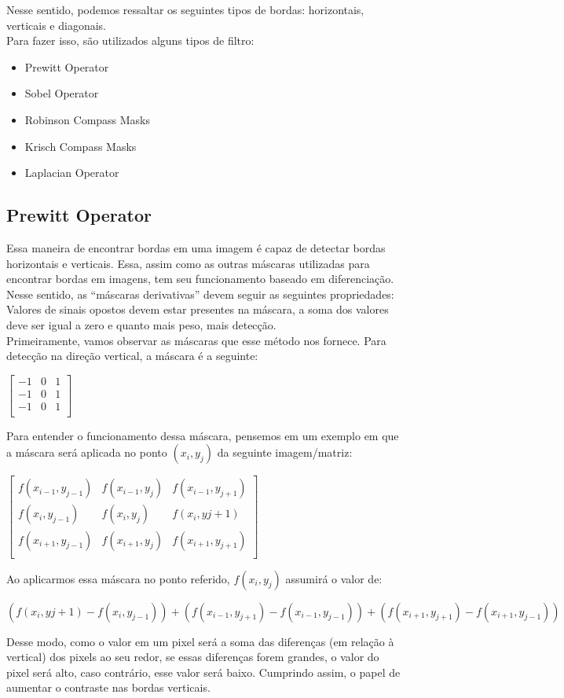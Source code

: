 \documentclass[a4paper, 12pt]{article}
\begin{document}
Nesse sentido, podemos ressaltar os seguintes tipos de bordas: horizontais, verticais e diagonais.
\\

Para fazer isso, são utilizados alguns tipos de filtro:
\begin{itemize}
	\item Prewitt Operator
 	\item Sobel Operator
  	\item Robinson Compass Masks
   	\item Krisch Compass Masks
    \item Laplacian Operator 
\end{itemize}

\subsection{Prewitt Operator}
Essa maneira de encontrar bordas em uma imagem é capaz de detectar bordas horizontais e verticais. Essa, assim como as outras máscaras utilizadas para encontrar 
bordas em imagens, tem seu funcionamento baseado em diferenciação. Nesse sentido, as ``máscaras derivativas'' devem seguir as seguintes propriedades: 
Valores de sinais opostos devem estar presentes na máscara, a soma dos valores deve ser igual a zero e quanto mais peso, mais detecção.
\\

Primeiramente, vamos observar as máscaras que esse método nos fornece. Para detecção na direção vertical, a máscara é a seguinte:
\begin{center}
	$
	\begin{bmatrix}
		-1 & 0 & 1 \\
		-1 & 0 & 1 \\
		-1 & 0 & 1 \\
	\end{bmatrix}
	$
\end{center}
Para entender o funcionamento dessa máscara, pensemos em um exemplo em que a máscara será aplicada no ponto $(x_i, y_j)$ da seguinte imagem/matriz:
\begin{center}
	$
	\begin{bmatrix}
		f(x_{i-1}, y_{j-1}) & f(x_{i-1}, y_j) & f(x_{i-1}, y_{j+1}) \\
		f(x_i, y_{j-1})     & f(x_i, y_j)     & f(x_i, y{j+1})      \\
		f(x_{i+1}, y_{j-1}) & f(x_{i+1}, y_j) & f(x_{i+1}, y_{j+1}) \\
	\end{bmatrix}
	$
\end{center}
Ao aplicarmos essa máscara no ponto referido, $f(x_i, y_j)$ assumirá o valor de:
\begin{center}
\small{$\left(f(x_i, y{j+1}) - f(x_i, y_{j-1})\right) + \left(f(x_{i-1}, y_{j+1}) - f(x_{i-1}, y_{j-1})\right) + \left(f(x_{i+1}, y_{j+1}) - f(x_{i+1}, y_{j-1})\right)$}
\end{center}
Desse modo, como o valor em um pixel será a soma das diferenças (em relação à vertical) dos pixels ao seu redor, se essas diferenças forem grandes, o valor do pixel 
será alto, caso contrário, esse valor será baixo. Cumprindo assim, o papel de aumentar o contraste nas bordas verticais.
\\
\end{document}
